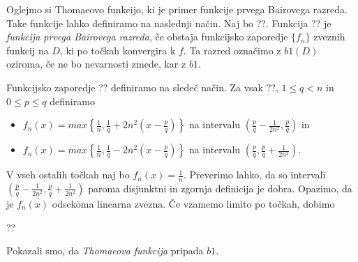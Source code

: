 \documentclass[a4paper]{article}
\begin{document}
Oglejmo si Thomaeovo funkcijo, ki je primer funkcije prvega Bairovega razreda.
Take funkcije lahko definiramo na naslednji način.
Naj bo ??. Funkcija ?? je \emph{funkcija prvega Bairovega razreda}, 
če obstaja funkcijsko zaporedje $\{f_n\}$ zveznih funkcij na $D$, ki po točkah konvergira k $f$. 
Ta razred označimo z $b1(D)$ oziroma, če ne bo nevarnosti zmede, kar z $b1$.

    Funkcijsko zaporedje ?? definiramo na sledeč način.
    Za vsak ??, $1 \le q < n$ in $0 \le p \le q$ definiramo
    \begin{itemize}
        \item \(f_n(x) = max\left\{\frac{1}{n}, \frac{1}{q} + 2n^2\left(x - \frac{p}{q}\right)\right\}\) na intervalu \(\left(\frac{p}{q} - \frac{1}{2n^2}, \frac{p}{q}\right)\) in
        \item \(f_n(x) = max\left\{\frac{1}{n}, \frac{1}{q} - 2n^2\left(x - \frac{p}{q}\right)\right\}\) na intervalu \(\left(\frac{p}{q}, \frac{p}{q} + \frac{1}{2n^2}\right)\).
    \end{itemize}
    V vseh ostalih točkah naj bo $f_n(x) = \frac{1}{n}$.
    Preverimo lahko, da so intervali $\left(\frac{p}{q} - \frac{1}{2n^2}, \frac{p}{q} + \frac{1}{2n^2}\right)$ paroma disjunktni in zgornja definicija je dobra.
    Opazimo, da je $f_n(x)$ odsekoma linearna zvezna. Če vzamemo limito po točkah, dobimo

    ??

    Pokazali smo, da \emph{Thomaeova funkcija} pripada $b1$. 

\end{document}
